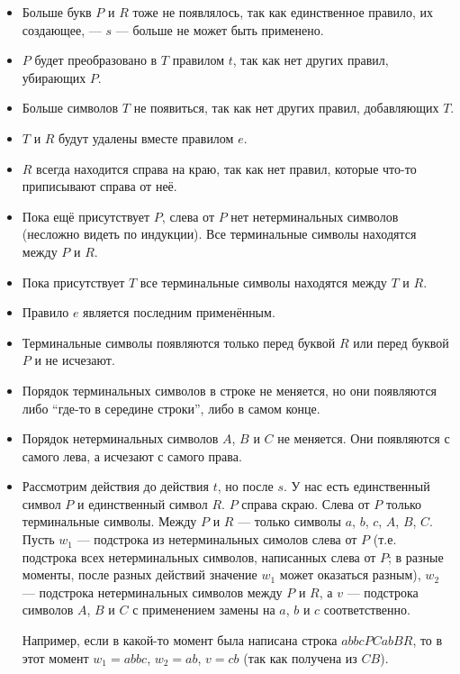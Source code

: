 \documentclass[12pt,a4paper]{article}
\begin{document}
\begin{problem}{5}
\begin{itemize}
            \item Больше букв $P$ и $R$ тоже не появлялось, так как единственное правило, их создающее, --- $s$ --- больше не может быть применено.
            \item $P$ будет преобразовано в $T$ правилом $t$, так как нет других правил, убирающих $P$.
            \item Больше символов $T$ не появиться, так как нет других правил, добавляющих $T$.
            \item $T$ и $R$ будут удалены вместе правилом $e$.
            \item $R$ всегда находится справа на краю, так как нет правил, которые что-то приписывают справа от неё.
            \item Пока ещё присутствует $P$, слева от $P$ нет нетерминальных символов (несложно видеть по индукции). Все терминальные символы находятся между $P$ и $R$.
            \item Пока присутствует $T$ все терминальные символы находятся между $T$ и $R$.
            \item Правило $e$ является последним применённым.
            \item Терминальные символы появляются только перед буквой $R$ или перед буквой $P$ и не исчезают.
            \item Порядок терминальных символов в строке не меняется, но они появляются либо ``где-то в середине строки'', либо в самом конце.
            \item Порядок нетерминальных символов $A$, $B$ и $C$ не меняется. Они появляются с самого лева, а исчезают с самого права.
            \item Рассмотрим действия до действия $t$, но после $s$. У нас есть единственный символ $P$ и единственный символ $R$. $P$ справа скраю. Слева от $P$ только терминальные символы. Между $P$ и $R$ --- только символы $a$, $b$, $c$, $A$, $B$, $C$. Пусть $w_1$ --- подстрока из нетерминальных симолов слева от $P$ (т.е. подстрока всех нетерминальных символов, написанных слева от $P$; в разные моменты, после разных действий значение $w_1$ может оказаться разным), $w_2$ --- подстрока нетерминальных символов между $P$ и $R$, а $v$ --- подстрока символов $A$, $B$ и $C$ с применением замены на $a$, $b$ и $c$ соответственно.

                Например, если в какой-то момент была написана строка $abbcPCabBR$, то в этот момент $w_1 = abbc$, $w_2 = ab$, $v = cb$ (так как получена из $CB$).


\end{itemize}
\end{problem}
\end{document}
